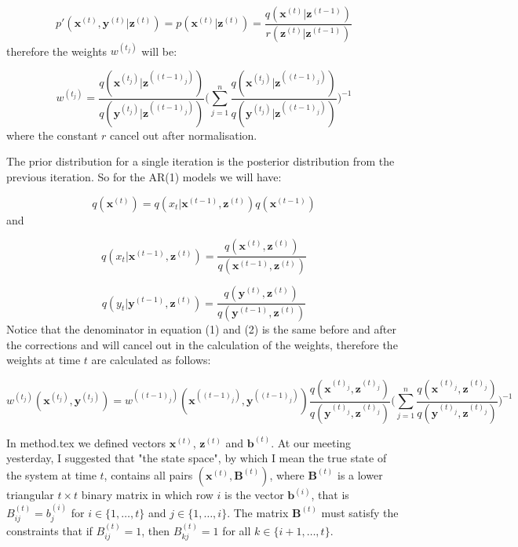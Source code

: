 \documentclass[11pt,a4paper]{article}
\renewcommand{\vec}[1]{\mathbf{#1}}
\begin{document}
\[
p'(\vec{x}^{(t)}, \vec{y}^{(t)} | \vec{z}^{(t)}) = p(\vec{x}^{(t)} | \vec{z}^{(t)}) = \frac{ q(\vec{x}^{(t)}|\vec{z}^{(t-1)})} {r(\vec{z}^{(t)} | \vec{z}^{(t-1)})}
\]
therefore the weights $w^{(t_j)}$ will be:

\[
w^{(t_j)} = \frac{q(\vec{x}^{(t_j)} | \vec{z}^{((t-1)_j)}) }{q(\vec{y}^{(t_j)} | \vec{z}^{((t-1)_j)})}\Bigg( \sum_{j=1}^n \frac{q(\vec{x}^{(t_j)} | \vec{z}^{((t-1)_j)}) }{q(\vec{y}^{(t_j)} | \vec{z}^{((t-1)_j)})}\Bigg)^{-1}
\]
where the constant $r$ cancel out after normalisation.

The prior distribution for a single iteration is the posterior distribution from the previous iteration.
So for the AR(1) models we will have:

\[
q(\vec{x}^{(t)}) = q(x_t | \vec{x}^{(t-1)}, \vec{z}^{(t)})q(\vec{x}^{(t-1)})
\]
and

\begin{equation}
q(x_t| \vec{x}^{(t-1)}, \vec{z}^{(t)}) = \frac{q(\vec{x}^{(t)} , \vec{z}^{(t)})}{q(\vec{x}^{(t-1)}, \vec{z}^{(t)})}
\end{equation}

\begin{equation}
q(y_t | \vec{y}^{(t-1)}, \vec{z}^{(t)}) = \frac{q(\vec{y}^{(t)}, \vec{z}^{(t)})}{q(\vec{y}^{(t-1)}, \vec{z}^{(t)})}
\end{equation}
Notice that the denominator in equation (1) and (2) is the same before and after the corrections and will cancel out in the calculation of the weights, therefore the weights at time $t$ are calculated as follows:

\[
w^{(t_j)}(\vec{x}^{(t_j)}, \vec{y}^{(t_j)}) = w^{((t-1)_j)}(\vec{x}^{((t-1)_j)}, \vec{y}^{((t-1)_j)}) \frac{q(\vec{x}^{(t)_j} , \vec{z}^{(t)_j})}{q(\vec{y}^{(t)_j}, \vec{z}^{(t)_j})} \Bigg( \sum_{j=1}^n \frac{q(\vec{x}^{(t)_j} , \vec{z}^{(t)_j})}{{q(\vec{y}^{(t)_j}, \vec{z}^{(t)_j})} }\Bigg)^{-1}
\]


In method.tex we defined vectors $\vec{x}^{(t)}$, $\vec{z}^{(t)}$ and $\vec{b}^{(t)}$. At our meeting yesterday, I suggested that "the state space", by which I mean the true state of the system at time $t$, contains all pairs $(\vec{x}^{(t)}, \vec{B}^{(t)})$, where $\vec{B}^{(t)}$ is a lower triangular $t \times t$ binary matrix in which row $i$ is the vector $\vec{b}^{(i)}$, that is $B_{ij}^{(t)} = b_j^{(i)}$ for $i \in \{ 1, \ldots, t \}$ and $j \in \{ 1, \ldots, i \}$. The matrix $\vec{B}^{(t)}$ must satisfy the constraints that if $B_{ij}^{(t)} = 1$, then $B_{kj}^{(t)} = 1$ for all $k \in \{ i+1, \ldots, t \}$.
\end{document}

